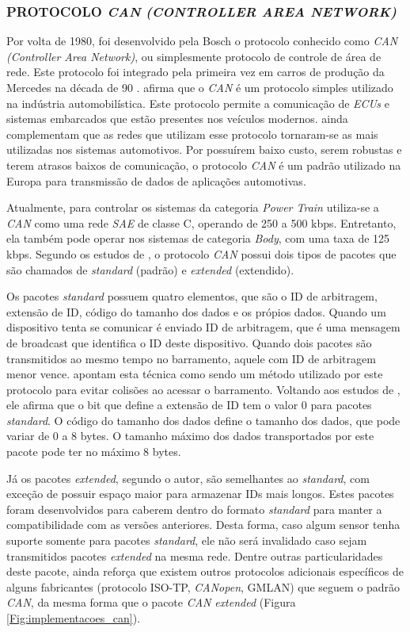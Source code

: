 \subsubsection{PROTOCOLO \textit{CAN} \textit{(CONTROLLER AREA NETWORK)}}
Por volta de 1980, foi desenvolvido pela Bosch o protocolo conhecido como \textit{CAN} \textit{(Controller Area Network)}, ou simplesmente protocolo de controle de área de rede. Este protocolo foi integrado pela primeira vez em carros de produção da Mercedes na década de 90 \cite{navetsimonotlion}.  afirma que o \textit{CAN} é um protocolo simples utilizado na indústria automobilística. Este protocolo permite a comunicação de \textit{ECUs} e sistemas embarcados que estão presentes nos veículos modernos.  ainda complementam que as redes que utilizam esse protocolo tornaram-se as mais utilizadas nos sistemas automotivos. Por possuírem baixo custo, serem robustas e terem atrasos baixos de comunicação, o protocolo \textit{CAN} é um padrão utilizado na Europa para transmissão de dados de aplicações automotivas.

Atualmente, para controlar os sistemas da categoria \textit{Power Train} utiliza-se a \textit{CAN} como uma rede \textit{SAE} de classe C, operando de 250 a 500 kbps. Entretanto, ela também pode operar nos sistemas de categoria \textit{Body}, com uma taxa de 125 kbps. Segundo os estudos de , o protocolo \textit{CAN} possui dois tipos de pacotes que são chamados de \textit{standard} (padrão) e \textit{extended} (extendido).

Os pacotes \textit{standard} possuem quatro elementos, que são o ID de arbitragem, extensão de ID, código do tamanho dos dados e os própios dados. Quando um dispositivo tenta se comunicar é enviado ID de arbitragem, que é uma mensagem de broadcast que identifica o ID deste dispositivo. Quando dois pacotes são transmitidos ao mesmo tempo no barramento, aquele com ID de arbitragem menor vence.  apontam esta técnica como sendo um método utilizado por este protocolo para evitar colisões ao acessar o barramento. Voltando aos estudos de , ele afirma que o bit que define a extensão de ID tem o valor 0 para pacotes \textit{standard}. O código do tamanho dos dados define o tamanho dos dados, que pode variar de 0 a 8 bytes. O tamanho máximo dos dados transportados por este pacote pode ter no máximo 8 bytes.

Já os pacotes \textit{extended}, segundo o autor, são semelhantes ao \textit{standard}, com exceção de possuir espaço maior para armazenar IDs mais longos. Estes pacotes foram desenvolvidos para caberem dentro do formato \textit{standard} para manter a compatibilidade com as versões anteriores. Desta forma, caso algum sensor tenha suporte somente para pacotes \textit{standard}, ele não será invalidado caso sejam transmitidos pacotes \textit{extended} na mesma rede. Dentre outras particularidades deste pacote,  ainda reforça que existem outros protocolos adicionais específicos de alguns fabricantes (protocolo ISO-TP, \textit{CANopen}, GMLAN) que seguem o padrão \textit{CAN}, da mesma forma que o pacote \textit{CAN} \textit{extended} (Figura \ref{Fig:implementacoes_can}).

